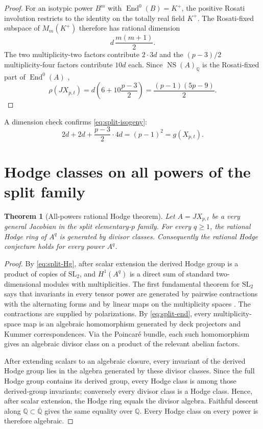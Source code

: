 \documentclass[11pt]{article}
\newtheorem{theorem}{Theorem}[section]
\theoremstyle{definition}
\theoremstyle{remark}
\newcommand{\Q}{\mathbb Q}
\newcommand{\End}{\operatorname{End}}
\newcommand{\NS}{\operatorname{NS}}
\begin{document}
\begin{proof}
For an isotypic power $B^m$ with $\End^0(B)=K^+$, the positive Rosati involution restricts to the identity on the totally real field $K^+$.  The Rosati-fixed subspace of $M_m(K^+)$ therefore has rational dimension
\[
 d\,\frac{m(m+1)}2.
\]
The two multiplicity-two factors contribute $2\cdot3d$ and the $(p-3)/2$ multiplicity-four factors contribute $10d$ each.  Since $\NS(A)_\Q$ is the Rosati-fixed part of $\End^0(A)$ \cite{BL},
\[
 \rho(JX_{p,t})
 =d\left(6+10\frac{p-3}{2}\right)
 =\frac{(p-1)(5p-9)}2.
\]
\end{proof}

A dimension check confirms \eqref{eq:split-isogeny}:
\[
 2d+2d+\frac{p-3}{2}\cdot4d=(p-1)^2=g(X_{p,t}).
\]

\section{Hodge classes on all powers of the split family}

\begin{theorem}[All-powers rational Hodge theorem]\label{thm:all-powers-Hodge}
Let $A=JX_{p,t}$ be a very general Jacobian in the split elementary-$p$ family.  For every $q\ge1$, the rational Hodge ring of $A^q$ is generated by divisor classes.  Consequently the rational Hodge conjecture holds for every power $A^q$.
\end{theorem}

\begin{proof}
By \eqref{eq:split-Hg}, after scalar extension the derived Hodge group is a product of copies of $\mathrm{SL}_2$, and $H^1(A^q)$ is a direct sum of standard two-dimensional modules with multiplicities.  The first fundamental theorem for $\mathrm{SL}_2$ says that invariants in every tensor power are generated by pairwise contractions with the alternating forms and by linear maps on the multiplicity spaces \cite{Weyl}.  The contractions are supplied by polarizations.  By \eqref{eq:split-end}, every multiplicity-space map is an algebraic homomorphism generated by deck projectors and Kummer correspondences.  Via the Poincar\'e bundle, each such homomorphism gives an algebraic divisor class on a product of the relevant abelian factors.

After extending scalars to an algebraic closure, every invariant of the derived Hodge group lies in the algebra generated by these divisor classes.  Since the full Hodge group contains its derived group, every Hodge class is among those derived-group invariants; conversely every divisor class is a Hodge class.  Hence, after scalar extension, the Hodge ring equals the divisor algebra.  Faithful descent along $\Q\subset\overline{\Q}$ gives the same equality over $\Q$.  Every Hodge class on every power is therefore algebraic.
\end{proof}
\end{document}

